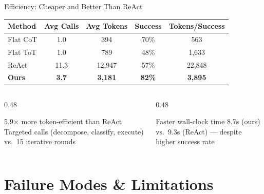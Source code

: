 \documentclass[aspectratio=169]{beamer}
\begin{document}
\begin{frame}{Efficiency: Cheaper and Better Than ReAct}

\centering
\begin{tabular}{lcccc}
\toprule
\textbf{Method} & \textbf{Avg Calls} & \textbf{Avg Tokens} & \textbf{Success} & \textbf{Tokens/Success} \\
\midrule
Flat CoT & 1.0 & 394 & 70\% & 563 \\
Flat ToT & 1.0 & 789 & 48\% & 1,633 \\
ReAct & 11.3 & 12,947 & 57\% & 22,848 \\
\textbf{Ours} & \textbf{3.7} & \textbf{3,181} & \textbf{82\%} & \textbf{3,895} \\
\bottomrule
\end{tabular}

\vspace{0.5cm}
\begin{columns}[T]
\begin{column}{0.48\textwidth}
\begin{block}{5.9$\times$ more token-efficient than ReAct}
Targeted calls (decompose, classify, execute) vs.\ 15 iterative rounds
\end{block}
\end{column}
\begin{column}{0.48\textwidth}
\begin{block}{Faster wall-clock time}
8.7s (ours) vs.\ 9.3s (ReAct) --- despite higher success rate
\end{block}
\end{column}
\end{columns}

\end{frame}

\section{Failure Modes \& Limitations}
\end{document}
